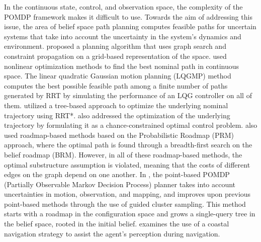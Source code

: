 \documentclass[Afour,sageh,times]{sagej}
\begin{document}
In the continuous state, control, and observation space, the complexity of the POMDP framework makes it difficult to use. 
Towards the aim of addressing this issue, the area of belief space path planning computes feasible paths for uncertain systems that take into account the uncertainty in the system's dynamics and environment. \cite{censi2008bayesian_censi} proposed a planning algorithm that uses graph search and constraint propagation on a grid-based representation of the space. \cite{platt2010belief_platt_2010} used nonlinear optimization methods to find the best nominal path in continuous space. The linear quadratic Gaussian motion planning (LQGMP) method \cite{van2011lqg_van_2010} computes the best possible feasible path among a finite number of paths generated by RRT by simulating the performance of an LQG controller on all of them. \cite{bry2011rapidly_bry_and_roy} utilized a tree-based approach to optimize the underlying nominal trajectory using RRT*. \cite{vitus2011closed_related_to_cc_3} also addressed the optimization of the underlying trajectory by formulating it as a chance-constrained optimal control problem. 
\cite{prentice2009belief_brm}  also used roadmap-based methods based on the Probabilistic Roadmap (PRM) approach, where the optimal path is found through a breadth-first search on the belief roadmap (BRM). However, in all of these roadmap-based methods, the optimal substructure assumption is violated, meaning that the costs of different edges on the graph depend on one another. In \cite{kurniawati2012global}, the point-based POMDP (Partially Observable Markov Decision Process) planner takes into account uncertainties in motion, observation, and mapping, and improves upon previous point-based methods through the use of guided cluster sampling. This method starts with a roadmap in the configuration space and grows a single-query tree in the belief space, rooted in the initial belief. \cite{roy1999coastal} examines the use of a coastal navigation strategy to assist the agent's perception during navigation. 

\end{document}
